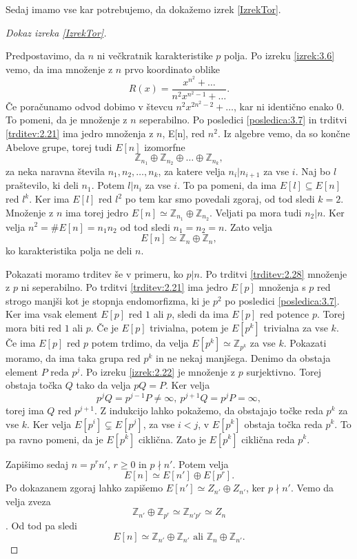 \documentclass[12pt,a4paper,twoside]{article}
\theoremstyle{definition} %
\theoremstyle{plain} %
\numberwithin{equation}{section}  %
\newcommand{\Z}{\mathbb Z}
\begin{document}
Sedaj imamo vse kar potrebujemo, da dokažemo izrek \ref{IzrekTor}.

\begin{proof}[Dokaz izreka \ref{IzrekTor}]~

Predpostavimo, da $n$ ni večkratnik karakteristike $p$ polja. Po izreku \ref{izrek:3.6} vemo, da ima množenje z $n$ prvo koordinato oblike
$$R(x) = \frac{x^{n^2}+\ldots}{n^2x^{n^2-1}+ \ldots}.$$
Če poračunamo odvod dobimo v števcu $n^2x^{2n^2-2}+ \ldots$, kar ni identično enako $0$. To pomeni, da je množenje z $n$ seperabilno. Po posledici \ref{posledica:3.7} in trditvi \ref{trditev:2.21} ima jedro množenja z $n$, E[n], red $n^2$. Iz algebre vemo, da so končne Abelove grupe, torej tudi  $E[n]$ izomorfne
$$\Z_{n_1} \oplus \Z_{n_2} \oplus \ldots \oplus \Z_{n_k},$$
za neka naravna števila $n_1,n_2,\ldots,n_k$, za katere velja $n_i|n_{i+1}$  za vse $i$. Naj bo $l$ praštevilo, ki deli $n_1$. Potem $l|n_i$ za vse $i$. To pa pomeni, da ima $E[l] \subseteq E[n]$ red $l^k$. Ker ima $E[l]$ red $l^2$ po tem kar smo povedali zgoraj, od tod sledi $k=2$. Množenje z $n$ ima torej jedro $E[n] \simeq \Z_{n_1} \oplus \Z_{n_2}$. Veljati pa mora tudi $n_2|n$. Ker velja $n^2=\#E[n] = n_1n_2$ od tod sledi $n_1=n_2=n$. Zato velja
$$E[n] \simeq \Z_n \oplus \Z_n,$$
ko karakteristika polja ne deli $n$.

Pokazati moramo trditev še v primeru, ko $p|n$. Po trditvi \ref{trditev:2.28} množenje z $p$ ni seperabilno. Po trditvi \ref{trditev:2.21} ima jedro $E[p]$ množenja s $p$ red strogo manjši kot je stopnja endomorfizma, ki je $p^2$ po posledici \ref{posledica:3.7}. Ker ima vsak element $E[p]$ red $1$ ali $p$, sledi da ima $E[p]$ red potence $p$. Torej mora biti red $1$ ali $p$. Če je $E[p]$ trivialna, potem je $E[p^k]$ trivialna za vse $k$. Če ima $E[p]$ red $p$ potem trdimo, da velja $E[p^k] \simeq \Z_{p ^k}$ za vse $k$. Pokazati moramo, da ima taka grupa red $p^k$ in ne nekaj manjšega. Denimo da obstaja element $P$ reda $p^j$. Po izreku \ref{izrek:2.22} je množenje z $p$ surjektivno. Torej obstaja točka $Q$ tako da velja $pQ = P$. Ker velja
$$p^jQ = p^{j-1}P \neq \infty, \ p^{j+1}Q = p^jP = \infty,$$
torej ima $Q$ red $p^{j+1}$. Z indukcijo lahko pokažemo, da obstajajo točke reda $p^k$ za vse $k$.
Ker velja $E[p^{i}] \subsetneq E[p^j]$, za vse $i < j$, v $E[p^k]$ obstaja točka reda $p^k$. To pa ravno pomeni, da je $E[p^k]$ ciklična. Zato je $E[p^k]$ ciklična reda $p^k$.

Zapišimo sedaj $n=p^rn'$, $r\geq0$ in $p\nmid n'$. Potem velja
$$E[n] \simeq E[n'] \oplus E[p^r].$$
Po dokazanem zgoraj lahko zapišemo $E[n'] \simeq Z_{n'} \oplus Z_{n'}$, ker $p \nmid n'$. Vemo da velja zveza
$$\Z_{n'} \oplus \Z_{p^r} \simeq \Z_{n'p^r} \simeq Z_n$$.
Od tod pa sledi
$$E[n] \simeq \Z_{n'} \oplus \Z_{n'} \text{ ali } \Z_n \oplus \Z_{n'}.$$
\end{proof}
\end{document}
